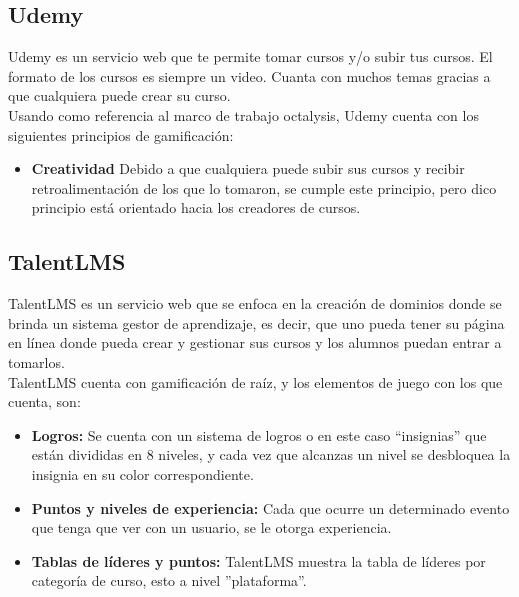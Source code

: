 \begin{multicols*}{2}
\begin{itemize}
    \end{itemize}
    
\vfill\null
\columnbreak
\subsection*{Udemy}

 Udemy es un servicio web que te permite tomar cursos y/o subir tus cursos.
 El formato de los cursos es siempre un video. Cuanta con muchos temas
 gracias a que cualquiera puede crear su curso.\\

    \noindent Usando como referencia al marco de trabajo octalysis,
    Udemy cuenta con los siguientes principios de gamificación:
    
    \begin{itemize}
        \item {\bf Creatividad} Debido a que cualquiera puede subir
        sus cursos y recibir retroalimentación de los que lo tomaron,
        se cumple este principio, pero dico principio está orientado
        hacia los creadores de cursos.
        
    \end{itemize}
    
    
    
\subsection*{TalentLMS}

 TalentLMS es un servicio web que se enfoca en la creación de dominios donde se
 brinda un sistema gestor de aprendizaje, es decir, que uno pueda tener su página
 en línea donde pueda crear y gestionar sus cursos y los alumnos puedan entrar a tomarlos.\\
    
    \noindent TalentLMS cuenta con gamificación de raíz,
    y los elementos de juego con los que cuenta, son:
    
    \begin{itemize} 
    
        \item {\bf Logros:} Se cuenta con un sistema de logros o en este caso
        ``insignias'' que están divididas en 8 niveles, y cada vez que alcanzas
        un nivel se desbloquea la insignia en su color correspondiente.
        
        \item {\bf Puntos y niveles de experiencia:} Cada que ocurre un
        determinado evento que tenga que ver con un usuario, se le otorga experiencia.
        
        \item {\bf Tablas de líderes y puntos:} TalentLMS muestra la
        tabla de líderes por categoría de curso, esto a nivel ''plataforma''.
        
    \end{itemize}
    
\end{multicols*}



